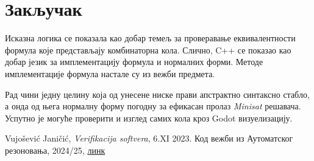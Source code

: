 \documentclass[a4paper,10pt]{article}
\begin{document}
\section{Закључак}
\label{sec:zakljucak}

Исказна логика се показала као добар темељ за проверавање еквивалентности формула које представљају комбинаторна кола. Слично, C++ се показао као добар језик за имплементацију формула и нормалних форми. Методе имплементације формула настале су из вежби предмета\cite{ar_vezbe}.

Рад чини једну целину која од унесене ниске прави апстрактно синтаксно стабло, а онда од њега нормалну форму погодну за ефикасан пролаз \textit{Minisat} решавача. Успутно је могуће проверити и изглед самих кола кроз Godot визуелизацију.

\begin{thebibliography}{100}
 Vujošević Janičić, \textit{Verifikacija softvera}, 6.XI 2023.
 Код вежби из Аутоматског резоновања, 2024/25, \href{https://github.com/idrecun/ar-materijali}{линк}
\end{thebibliography}
\end{document}
